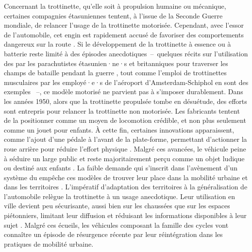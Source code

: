 \begin{refsegment}
Concernant la trottinette, qu’elle soit à propulsion humaine ou mécanique, certaines compagnies étasuniennes tentent, à l’issue de la Seconde Guerre mondiale, de relancer l’usage de la trottinette motorisée. Cependant, avec l’essor de l’automobile, cet engin est rapidement accusé de favoriser des comportements dangereux sur la route \textcolor{blue}{\autocite{smithsonian_magazine_motorized_2019}}. Si le développement de la trottinette à essence ou à batterie reste limité à des épisodes anecdotiques~–~quelques récits sur l’utilisation des  par les parachutistes étasunien·ne·s et britanniques pour traverser les champs de bataille pendant la guerre \textcolor{blue}{\autocite{historia_trottinette_2013}}, tout comme l’emploi de trottinettes musculaires par les employé·e·s de l’aéroport d’Amsterdam-Schiphol en sont des exemples \textcolor{blue}{\autocite{historia_trottinette_2013}}~–, ce modèle motorisé ne parvient pas à s’imposer durablement. Dans les années 1950, alors que la trottinette propulsée tombe en désuétude, des efforts sont entrepris pour relancer la trottinette non motorisée. Les fabricants tentent de la positionner comme un moyen de locomotion crédible, et non plus seulement comme un jouet pour enfants. À cette fin, certaines innovations apparaissent, comme l’ajout d’une pédale à l’avant de la plate-forme, permettant d’actionner la roue arrière pour réduire l’effort physique \textcolor{blue}{\autocite{arte_histoire_2014}}. Malgré ces avancées, le véhicule peine à séduire un large public et reste majoritairement perçu comme un objet ludique ou destiné aux enfants \textcolor{blue}{\autocite{jeux_et_compagnie_histoire_2013}}. La faible demande qui s'inscrit dans l'avènement d'un système du  empêche ces modèles de trouver leur place dans la mobilité urbaine et dans les territoires \textcolor{blue}{\autocite{historia_trottinette_2013}}. L'impératif d'adaptation des territoires à la généralisation de l'automobile relègue la trottinette à un usage anecdotique. Leur utilisation en ville devient peu sécurisante, aussi bien sur les chaussées que sur les espaces piétonniers, limitant leur diffusion et réduisant les informations disponibles à leur sujet \textcolor{blue}{\autocite{e-trottr_levolution_2019}}. Malgré ces écueils, les véhicules composant la famille des cycles vont connaître un épisode de résurgence récente par leur réintégration dans les pratiques de mobilité urbaine.%


\end{refsegment}
